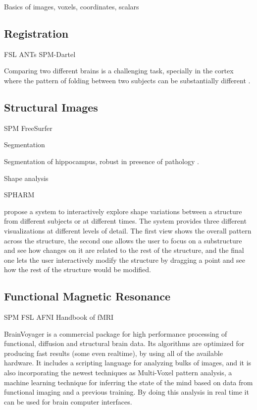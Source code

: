 Basics of images, voxels, coordinates, scalars


\subsection{Registration}

FSL
ANTs
SPM-Dartel


Comparing two different brains is a challenging task, specially in the cortex where the pattern of folding between two subjects can be substantially different \autocite{toga_new_2002}.

\subsection{Structural Images}

SPM
FreeSurfer

Segmentation

Segmentation of hippocampus, robust in presence of pathology \autocite{kim_robust_2011}.

Shape analysis

SPHARM

\autocite{hermann_visual_2014} propose a system to interactively explore shape variations between a structure from different subjects or at different times. The system provides three different visualizations at different levels of detail. The first view shows the overall pattern across the structure, the second one allows the user to focus on a substructure and see how changes on it are related to the rest of the structure, and the final one lets the user interactively modify the structure by dragging a  point and see how the rest of the structure would be modified. 

\subsection{Functional Magnetic Resonance}

SPM
FSL
AFNI
Handbook of fMRI

BrainVoyager \autocite{goebel_brainvoyagerpast_2012} is a commercial package for high performance processing of functional, diffusion and structural brain data. Its algorithms are optimized for producing fast results (some even realtime), by using all of the available hardware. It includes a scripting language for analyzing bulks of images, and it is also incorporating the newest techniques as Multi-Voxel pattern analysis, a machine learning technique for inferring the state of the mind based on data from functional imaging and a previous training. By doing this analysis in real time it can be used for brain computer interfaces. 

